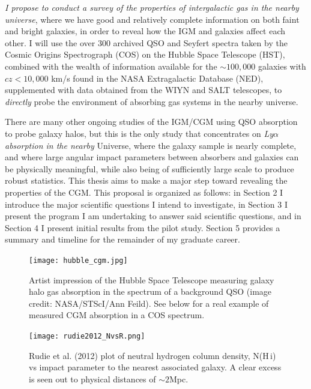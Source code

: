 \documentclass[iop]{emulateapj-rtx4}
\begin{document}
\textit{I propose to conduct a survey of the properties of intergalactic gas in the nearby universe}, where we have good and relatively complete information on both faint and bright galaxies, in order to reveal how the IGM and galaxies affect each other. I will use the over 300 archived QSO and Seyfert spectra taken by the Cosmic Origins Spectrograph (COS) on the Hubble Space Telescope (HST), combined with the wealth of information available for the $\sim100,000$ galaxies with $cz<10,000$ km/s found in the NASA Extragalactic Database (NED), supplemented with data obtained from the WIYN and SALT telescopes, to \textit{directly} probe the environment of absorbing gas systems in the nearby universe. 

There are many other ongoing studies of the IGM/CGM using QSO absorption to probe galaxy halos, but this is the only study that concentrates on \textit{Ly$\alpha$ absorption in the nearby} Universe, where the galaxy sample is nearly complete, and where large angular impact parameters between absorbers and galaxies can be physically meaningful, while also being of sufficiently large scale to produce robust statistics. This thesis aims to make a major step toward revealing the properties of the CGM. This proposal is organized as follows: in Section 2 I introduce the major scientific questions I intend to investigate, in Section 3 I present the program I am undertaking to answer said scientific questions, and in Section 4 I present initial results from the pilot study. Section 5 provides a summary and timeline for the remainder of my graduate career.

\begin{figure}[]
  \begin{centering}
  \texttt{[image: hubble\_cgm.jpg]}
  \caption{\small{Artist impression of the Hubble Space Telescope measuring galaxy halo gas absorption in the spectrum of a background QSO (image credit: NASA/STScI/Ann Feild). See below for a real example of measured CGM absorption in a COS spectrum.}}
  \label{hubble_cgm}
  \vspace{10pt}
  \end{centering}
\end{figure}


\begin{figure}[]
  \begin{centering}
  \texttt{[image: rudie2012\_NvsR.png]}
  \caption{\small{Rudie et al. (2012) plot of neutral hydrogen column density, N(H\,{\sc i}) vs impact parameter to the nearest associated galaxy. A clear excess is seen out to physical distances of $\sim2$Mpc.}}
  \label{rudie2012}
  \vspace{10pt}
  \end{centering}
\end{figure}
\end{document}
